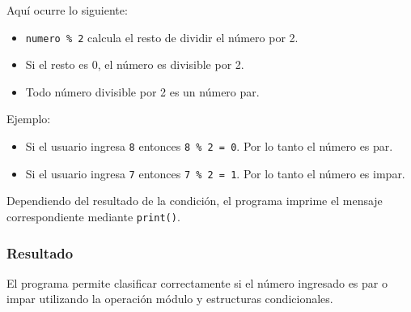\begin{solution}
Aquí ocurre lo siguiente:

\begin{itemize}
\item \texttt{numero \% 2} calcula el resto de dividir el número por 2.
\item Si el resto es 0, el número es divisible por 2.
\item Todo número divisible por 2 es un número par.
\end{itemize}

Ejemplo:

\begin{itemize}
\item Si el usuario ingresa \texttt{8}  
      entonces \texttt{8 \% 2 = 0}.  
      Por lo tanto el número es par.

\item Si el usuario ingresa \texttt{7}  
      entonces \texttt{7 \% 2 = 1}.  
      Por lo tanto el número es impar.
\end{itemize}

Dependiendo del resultado de la condición, el programa imprime el mensaje correspondiente mediante \texttt{print()}.

\subsubsection*{Resultado}

El programa permite clasificar correctamente si el número ingresado es par o impar utilizando la operación módulo y estructuras condicionales.

\end{solution}
